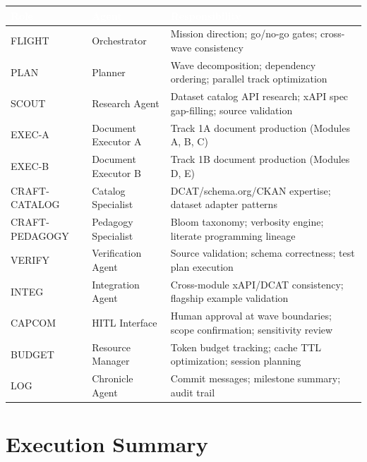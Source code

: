 \documentclass[11pt,letterpaper]{article}
\newcommand{\tableheader}[1]{\textbf{\sffamily\textcolor{white}{#1}}}
\begin{document}
\begin{center}
\begin{tabularx}{\textwidth}{L{2cm}L{3.5cm}X}
\toprule
{}
\tableheader{Role} & \tableheader{Agent} & \tableheader{Responsibility} \\
\midrule
FLIGHT & Orchestrator & Mission direction; go/no-go gates; cross-wave consistency \\
PLAN & Planner & Wave decomposition; dependency ordering; parallel track optimization \\
SCOUT & Research Agent & Dataset catalog API research; xAPI spec gap-filling; source validation \\
EXEC-A & Document Executor A & Track 1A document production (Modules A, B, C) \\
EXEC-B & Document Executor B & Track 1B document production (Modules D, E) \\
CRAFT-CATALOG & Catalog Specialist & DCAT/schema.org/CKAN expertise; dataset adapter patterns \\
CRAFT-PEDAGOGY & Pedagogy Specialist & Bloom taxonomy; verbosity engine; literate programming lineage \\
VERIFY & Verification Agent & Source validation; schema correctness; test plan execution \\
INTEG & Integration Agent & Cross-module xAPI/DCAT consistency; flagship example validation \\
CAPCOM & HITL Interface & Human approval at wave boundaries; scope confirmation; sensitivity review \\
BUDGET & Resource Manager & Token budget tracking; cache TTL optimization; session planning \\
LOG & Chronicle Agent & Commit messages; milestone summary; audit trail \\
\bottomrule
\end{tabularx}
\end{center}

\section{Execution Summary}
\end{document}
